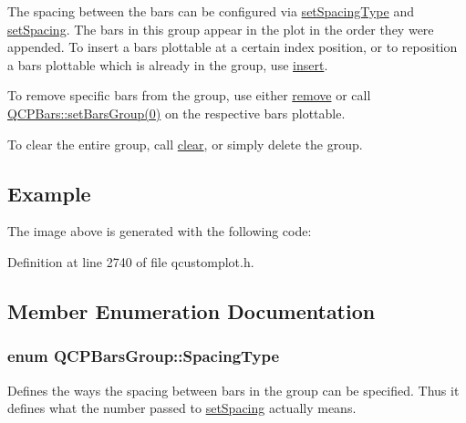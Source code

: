 The spacing between the bars can be configured via \hyperlink{class_q_c_p_bars_group_a2c7e2d61b10594a4555b615e1fcaf49e}{set\+Spacing\+Type} and \hyperlink{class_q_c_p_bars_group_aa553d327479d72a0c3dafcc724a190e2}{set\+Spacing}. The bars in this group appear in the plot in the order they were appended. To insert a bars plottable at a certain index position, or to reposition a bars plottable which is already in the group, use \hyperlink{class_q_c_p_bars_group_a309a5f7233db189f3ea9c2d04ece6c13}{insert}.

To remove specific bars from the group, use either \hyperlink{class_q_c_p_bars_group_a215e28a5944f1159013a0e19169220e7}{remove} or call \hyperlink{class_q_c_p_bars_aedd1709061f0b307c47ddb45e172ef9a}{Q\+C\+P\+Bars\+:\+:set\+Bars\+Group(0)} on the respective bars plottable.

To clear the entire group, call \hyperlink{class_q_c_p_bars_group_a3ddf23928c6cd89530bd34ab7ba7b177}{clear}, or simply delete the group.\hypertarget{class_q_c_p_bars_group_qcpbarsgroup-example}{}\subsection{Example}\label{class_q_c_p_bars_group_qcpbarsgroup-example}
The image above is generated with the following code\+: 
\begin{DoxyCodeInclude}
\end{DoxyCodeInclude}


Definition at line 2740 of file qcustomplot.\+h.



\subsection{Member Enumeration Documentation}
\hypertarget{class_q_c_p_bars_group_a4c0521120a97e60bbca37677a37075b6}{}
\subsubsection[{Spacing\+Type}]{\setlength{\rightskip}{0pt plus 5cm}enum {\bf Q\+C\+P\+Bars\+Group\+::\+Spacing\+Type}}\label{class_q_c_p_bars_group_a4c0521120a97e60bbca37677a37075b6}
Defines the ways the spacing between bars in the group can be specified. Thus it defines what the number passed to \hyperlink{class_q_c_p_bars_group_aa553d327479d72a0c3dafcc724a190e2}{set\+Spacing} actually means.

